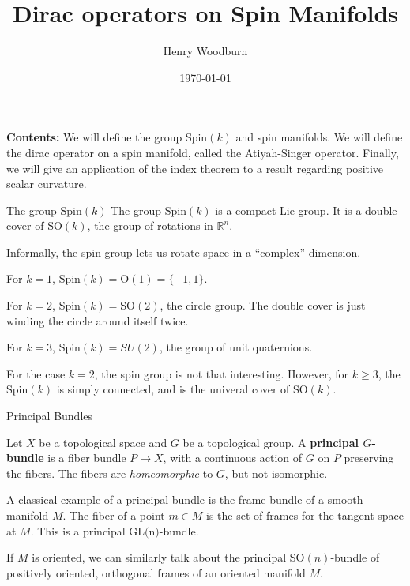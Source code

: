 \documentclass[11pt, reqno]{beamer}
\newcommand{\RR}{\mathbb{R}}
\begin{document}
\author[]{Henry Woodburn}
\title{Dirac operators on Spin Manifolds}
\date{\today}


\begin{frame}
    \titlepage
\end{frame}

\begin{frame}
    \textbf{Contents:} 
    We will define the group $\text{Spin}(k)$ and spin manifolds. We will define the dirac operator 
    on a spin manifold, called the Atiyah-Singer operator. Finally, we will give an application 
    of the index theorem to a result regarding positive scalar curvature. 
\end{frame}

\begin{frame}{The group $\text{Spin}(k)$}
    The group $\text{Spin}(k)$ is a compact Lie group. It is a double cover of $\text{SO}(k)$, the group
    of rotations in $\RR^n$. 

    Informally, the spin group lets us rotate space in a ``complex'' dimension.
    
    \begin{example}
        For $k = 1$, $\text{Spin}(k) = \text{O}(1) = \{-1, 1\}$. 

        For $k = 2$, $\text{Spin}(k) = \text{SO}(2)$, the circle group. The double cover
        is just winding the circle around itself twice.

        For $k = 3$, $\text{Spin}(k) = SU(2)$, the group of unit quaternions.
    \end{example}

    For the case $k = 2$, the spin group is not that interesting. However, for $k \geq 3$, 
    the $\text{Spin}(k)$ is simply connected, and is the univeral cover of $\text{SO}(k)$.
\end{frame} 

\begin{frame}{Principal Bundles}
    \begin{definition}
        Let $X$ be a topological space and $G$ be a topological group. A \textbf{principal $G$-bundle}
        is a fiber bundle $P \to X$, with a continuous action of $G$ on $P$ preserving the fibers.
        The fibers are \textit{homeomorphic} to $G$, but not isomorphic. 
    \end{definition}

    A classical example of a principal bundle is the frame bundle of a smooth manifold $M$. The
    fiber of a point $m \in M$ is the set of frames for the tangent space at $M$. This is a 
    principal $\text{GL(n)}$-bundle.
    
    \medskip
    If $M$ is oriented, we can similarly talk about the principal $\text{SO}(n)$-bundle of 
    positively oriented, orthogonal frames of an oriented manifold $M$. 
\end{frame}
\end{document}
